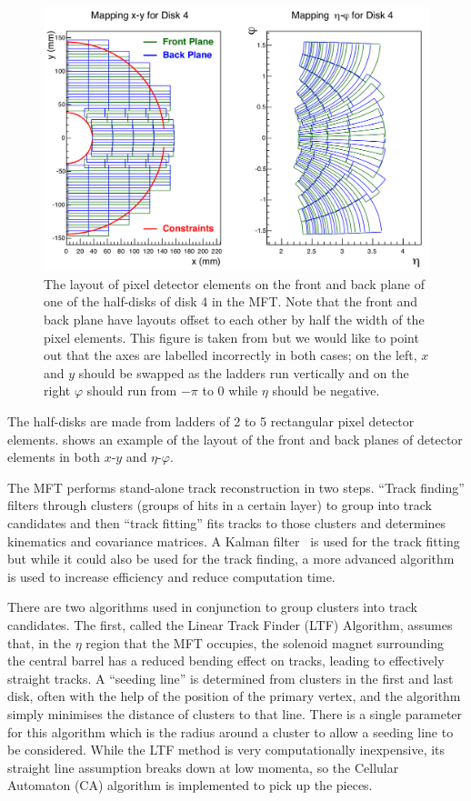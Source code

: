 \begin{figure}[h]
    \begin{center}
        \includegraphics[width=.8\textwidth]{Figs/MFT_Disk4_mapping.png}
        \caption{The layout of pixel detector elements on the front and back plane of one of the half-disks of disk 4 in the MFT. Note that the front and back plane have layouts offset to each other by half the width of the pixel elements. This figure is taken from \cite[fig.~6.1]{MFT_TDR} but we would like to point out that the axes are labelled incorrectly in both cases; on the left, $x$ and $y$ should be swapped as the ladders run vertically and on the right $\varphi$ should run from $-\pi$ to 0 while $\eta$ should be negative.}
        \label{fig:MFT_Disk4_mapping}
    \end{center}
\end{figure}

The half-disks are made from ladders of 2 to 5 rectangular pixel detector elements.  shows an example of the layout of the front and back planes of detector elements in both $x$-$y$ and $\eta$-$\varphi$. 

The MFT performs stand-alone track reconstruction in two steps. ``Track finding'' filters through clusters (groups of hits in a certain layer) to group into track candidates and then ``track fitting'' fits tracks to those clusters and determines kinematics and covariance matrices. A Kalman filter~\cite{Kalman} is used for the track fitting but while it could also be used for the track finding, a more advanced algorithm is used to increase efficiency and reduce computation time. 

There are two algorithms used in conjunction to group clusters into track candidates. The first, called the Linear Track Finder (LTF) Algorithm, assumes that, in the $\eta$ region that the MFT occupies, the solenoid magnet surrounding the central barrel has a reduced bending effect on tracks, leading to effectively straight tracks. A ``seeding line'' is determined from clusters in the first and last disk, often with the help of the position of the primary vertex, and the algorithm simply minimises the distance of clusters to that line. There is a single parameter for this algorithm which is the radius around a cluster to allow a seeding line to be considered. While the LTF method is very computationally inexpensive, its straight line assumption breaks down at low momenta, so the Cellular Automaton (CA) algorithm is implemented to pick up the pieces.

